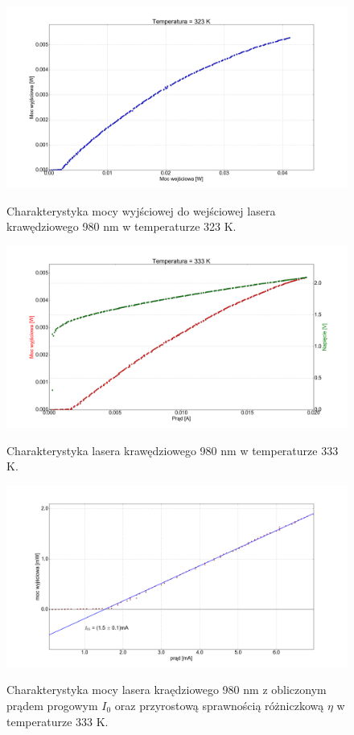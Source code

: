 \documentclass[a4paper, portrait,12pt]{report}
\begin{document}
\begin{figure}
\center
  \includegraphics[scale=0.30]{plot980/temp_50_power.png}
  \label{rys1}
  \caption{Charakterystyka mocy wyjściowej do wejściowej lasera krawędziowego 980 nm w temperaturze 323 K.}
\end{figure}
  

\begin{figure}
\center
  \includegraphics[scale=0.30]{plot980/temp_60_IVL.png}
  \label{rys1}
  \caption{Charakterystyka lasera krawędziowego 980 nm w temperaturze 333 K.} 
\end{figure}

\begin{figure}
\center
  \includegraphics[scale=0.30]{plot980/temp_60_fit.png}
  \label{rys1}
  \caption{Charakterystyka mocy lasera kraędziowego 980 nm z obliczonym prądem progowym $I_0$ oraz przyrostową sprawnością różniczkową $\eta$ w temperaturze 333 K.} 
\end{figure}
\end{document}
